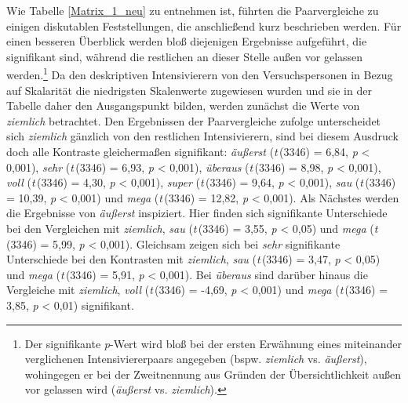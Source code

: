  Wie Tabelle \ref{Matrix_1_neu} zu entnehmen ist, führten die Paarvergleiche zu einigen diskutablen Feststellungen, die anschließend kurz beschrieben werden. Für einen besseren Überblick werden bloß diejenigen Ergebnisse aufgeführt, die signifikant sind, während die restlichen an dieser Stelle außen vor gelassen werden.\footnote{Der signifikante \textit{p}-Wert wird bloß bei der ersten Erwähnung eines miteinander verglichenen Intensiviererpaars angegeben (bspw. \textit{ziemlich} vs. \textit{äußerst}), wohingegen er bei der Zweitnennung aus Gründen der Übersichtlichkeit außen vor gelassen wird (\textit{äußerst} vs. \textit{ziemlich}).} Da den deskriptiven Intensivierern von den Versuchspersonen in Bezug auf Skalarität die niedrigsten Skalenwerte zugewiesen wurden und sie in der Tabelle daher den Ausgangspunkt bilden, werden zunächst die Werte von \textit{ziemlich} betrachtet. Den Ergebnissen der Paarvergleiche zufolge unterscheidet sich \textit{ziemlich} gänzlich von den restlichen Intensivierern, sind bei diesem Ausdruck doch alle Kontraste gleichermaßen signifikant: \textit{äußerst} {(\textit{t}\,(3346) = 6,84,} {\textit{p} < 0,001),} \textit{sehr} {(\textit{t}\,(3346) = 6,93,} {\textit{p} < 0,001)}, \textit{überaus} {(\textit{t}\,(3346) = 8,98}, {\textit{p} < 0,001)}, \textit{voll} {(\textit{t}\,(3346) = 4,30,} \textit{p} < 0,001), \textit{super} ({\textit{t}\,(3346) = 9,64,} \textit{p} < 0,001), \textit{sau} {(\textit{t}\,(3346) = 10,39,} \textit{p} < 0,001) und \textit{mega} {(\textit{t}\,(3346) = 12,82}, {\textit{p} < 0,001)}. Als Nächstes werden die Ergebnisse von \textit{äußerst} inspiziert. Hier finden sich signifikante Unterschiede bei den Vergleichen mit \textit{ziemlich}, \textit{sau} ({\textit{t}\,(3346) = 3,55, \textit{p} < 0,05)} und \textit{mega} {(\textit{t}\,(3346) = 5,99}, {\textit{p} < 0,001}). Gleichsam zeigen sich bei \textit{sehr} signifikante Unterschiede bei den Kontrasten mit \textit{ziemlich}, \textit{sau} (\textit{t}\,(3346) = 3,47, {\textit{p} < 0,05}) und \textit{mega} ({\textit{t}\,(3346) = 5,91}, {\textit{p} < 0,001)}. Bei \textit{überaus} sind darüber hinaus die Vergleiche mit \textit{ziemlich}, \textit{voll} ({\textit{t}\,(3346) = -4,69}, {\textit{p} < 0,001}) und \textit{mega} ({\textit{t}\,(3346) = 3,85,} {\textit{p} < 0,01}) signifikant.


